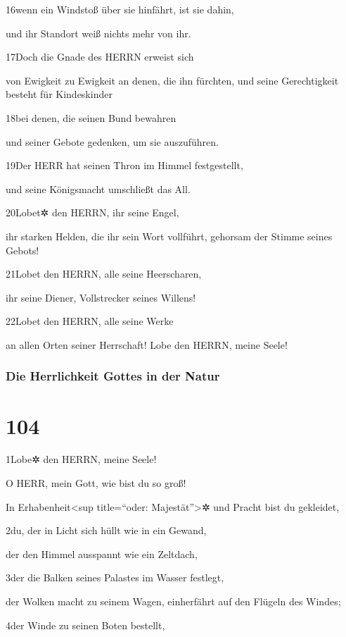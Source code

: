 16wenn ein Windstoß über sie hinfährt, ist sie dahin,

und ihr Standort weiß nichts mehr von ihr.

17Doch die Gnade des HERRN erweist sich

von Ewigkeit zu Ewigkeit an denen, die ihn fürchten, und seine
Gerechtigkeit besteht für Kindeskinder

18bei denen, die seinen Bund bewahren

und seiner Gebote gedenken, um sie auszuführen.

19Der HERR hat seinen Thron im Himmel festgestellt,

und seine Königsmacht umschließt das All.

20Lobet✲ den HERRN, ihr seine Engel,

ihr starken Helden, die ihr sein Wort vollführt, gehorsam der Stimme
seines Gebots!

21Lobet den HERRN, alle seine Heerscharen,

ihr seine Diener, Vollstrecker seines Willens!

22Lobet den HERRN, alle seine Werke

an allen Orten seiner Herrschaft! Lobe den HERRN, meine Seele!

\hypertarget{die-herrlichkeit-gottes-in-der-natur}{%
\subsubsection{Die Herrlichkeit Gottes in der
Natur}\label{die-herrlichkeit-gottes-in-der-natur}}

\hypertarget{section-103}{%
\section{104}\label{section-103}}

1Lobe✲ den HERRN, meine Seele!

O HERR, mein Gott, wie bist du so groß!

In Erhabenheit\textless sup title=``oder: Majestät''\textgreater✲ und
Pracht bist du gekleidet,

2du, der in Licht sich hüllt wie in ein Gewand,

der den Himmel ausspannt wie ein Zeltdach,

3der die Balken seines Palastes im Wasser festlegt,

der Wolken macht zu seinem Wagen, einherfährt auf den Flügeln des
Windes;

4der Winde zu seinen Boten bestellt,

